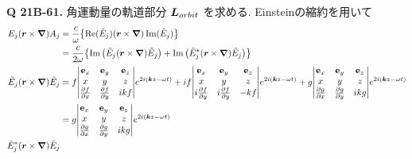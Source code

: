 \documentclass[uplatex,dvipdfmx,a4paper,11pt]{jlreq}
\newcommand{\rr}{\bm{r}}
\newcommand{\kk}{\bm{k}}
\theoremstyle{definition}
\begin{document}
\textbf{Q 21B-61.}
角運動量の軌道部分 $\bm{L}_{orbit}$ を求める. Einsteinの縮約を用いて
\begin{align}
  E_j(\rr\times\vnabla)A_j
                    & = \frac{c}{\omega}\qty{\Re(\Et_j)(\rr\times\vnabla)\Im(\Et_j)}                                                                                                                                                                                                                                       \\
                    & = \frac{c}{2\omega}\qty{\Im\qty(\Et_j(\rr\times\vnabla)\Et_j) + \Im\qty(\Et_j^*(\rr\times\vnabla)\Et_j)}                                                                                                                                                                                             \\
  \Et_j(\rr\times\vnabla)\Et_j
                    & = f\mqty|\vb{e}_x                                                                                                                                                                                                                                                              & \vb{e}_y & \vb{e}_z \\ x & y & z \\ \pdv{f}{x} & \pdv{f}{y} & \ii kf | e^{2\ii(\kk z-\omega t)} + \ii f\mqty|\vb{e}_x                                                                                        & \vb{e}_y & \vb{e}_z \\ x & y & z \\ \ii\pdv{f}{y} & \ii\pdv{f}{y} & -kf | e^{2\ii(\kk z-\omega t)} + g\mqty|\vb{e}_x                                                                                        & \vb{e}_y & \vb{e}_z \\ x & y & z \\ \pdv{g}{x} & \pdv{g}{y} & \ii kg | e^{2\ii(\kk z-\omega t)} \\
                    & = g\mqty|\vb{e}_x                                                                                                                                                                                                                                                              & \vb{e}_y & \vb{e}_z \\ x & y & z \\ \pdv{g}{x} & \pdv{g}{y} & \ii kg | e^{2\ii(\kk z-\omega t)} \\
  \Et_j^*(\rr\times\vnabla)\Et_j

\end{align}
\end{document}
